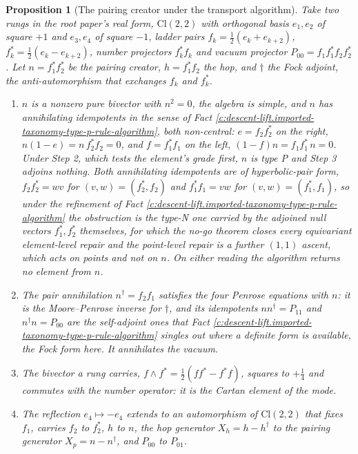 \documentclass[11pt]{article}
\newtheorem{proposition}[theorem]{Proposition}
\theoremstyle{definition}
\theoremstyle{plain}
\providecommand{\Cl}{}\renewcommand{\Cl}{\mathrm{Cl}}
\begin{document}
\begin{proposition}[The pairing creator under the transport algorithm]\label{c:descent-lift.pairing-creator-under-transport-algorithm}
Take two rungs in the root paper's real form, $\Cl(2,2)$ with orthogonal basis $e_{1}, e_{2}$ of square $+1$ and $e_{3}, e_{4}$ of square $-1$, ladder pairs $f_{k} = \tfrac12(e_{k} + e_{k+2})$, $f_{k}^{*} = \tfrac12(e_{k} - e_{k+2})$, number projectors $f_{k}^{*}f_{k}$ and vacuum projector $P_{00} = f_{1}f_{1}^{*}f_{2}f_{2}^{*}$ \cite[Thm.~7.1]{ButlerT1}. Let $n = f_{1}^{*}f_{2}^{*}$ be the pairing creator, $h = f_{1}^{*}f_{2}$ the hop, and $\dagger$ the Fock adjoint, the anti-automorphism that exchanges $f_{k}$ and $f_{k}^{*}$.
\begin{enumerate}
\item[(i)] $n$ is a nonzero pure bivector with $n^{2} = 0$, the algebra is simple, and $n$ has annihilating idempotents in the sense of Fact \ref{c:descent-lift.imported-taxonomy-type-p-rule-algorithm}, both non-central: $e = f_{2}f_{2}^{*}$ on the right, $n(1 - e) = n\,f_{2}^{*}f_{2} = 0$, and $f = f_{1}^{*}f_{1}$ on the left, $(1 - f)n = f_{1}f_{1}^{*}\,n = 0$. Under Step 2, which tests the element's grade first, $n$ is type P and Step 3 adjoins nothing. Both annihilating idempotents are of hyperbolic-pair form, $f_{2}f_{2}^{*} = wv$ for $(v, w) = (f_{2}^{*}, f_{2})$ and $f_{1}^{*}f_{1} = vw$ for $(v, w) = (f_{1}^{*}, f_{1})$, so under the refinement of Fact \ref{c:descent-lift.imported-taxonomy-type-p-rule-algorithm} the obstruction is the type-N one carried by the adjoined null vectors $f_{1}^{*}, f_{2}^{*}$ themselves, for which the no-go theorem closes every equivariant element-level repair and the point-level repair is a further $(1,1)$ ascent, which acts on points and not on $n$. On either reading the algorithm returns no element from $n$.
\item[(ii)] The pair annihilation $n^{\dagger} = f_{2}f_{1}$ satisfies the four Penrose equations with $n$: it is the Moore--Penrose inverse for $\dagger$, and its idempotents $nn^{\dagger} = P_{11}$ and $n^{\dagger}n = P_{00}$ are the self-adjoint ones that Fact \ref{c:descent-lift.imported-taxonomy-type-p-rule-algorithm} singles out where a definite form is available, the Fock form here. It annihilates the vacuum.
\item[(iii)] The bivector a rung carries, $f \wedge f^{*} = \tfrac12(ff^{*} - f^{*}f)$, squares to $+\tfrac14$ and commutes with the number operator: it is the Cartan element of the mode.
\item[(iv)] The reflection $e_{4} \mapsto -e_{4}$ extends to an automorphism of $\Cl(2,2)$ that fixes $f_{1}$, carries $f_{2}$ to $f_{2}^{*}$, $h$ to $n$, the hop generator $X_{h} = h - h^{\dagger}$ to the pairing generator $X_{p} = n - n^{\dagger}$, and $P_{00}$ to $P_{01}$.

\end{enumerate}
\end{proposition}
\end{document}
